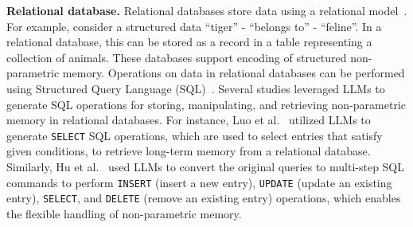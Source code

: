 \documentclass[journal,hideappendix]{vgtc}
\newenvironment{j_itemize}{
\begin{itemize}[]
  \setlength{\itemsep}{3pt}
  \setlength{\parskip}{0pt}
  \setlength{\parsep}{0pt}
}{\end{itemize}}
\begin{document}
\begin{j_itemize}

    \item[$\bullet$] \textbf{Relational database.} Relational databases store data using a relational model~\cite{codd1970relational,codd2007relational}. For example, consider a structured data ``tiger'' - ``belongs to'' - ``feline''. In a relational database, this can be stored as a record in a table representing a collection of animals. These databases support encoding of structured non-parametric memory. Operations on data in relational databases can be performed using Structured Query Language (SQL)~\cite{beaulieu2009learning}. Several studies leveraged LLMs to generate SQL operations for storing, manipulating, and retrieving non-parametric memory in relational databases. For instance, Luo et al.~\cite{luo2023chatkbqa} utilized LLMs to generate \texttt{SELECT} SQL operations, which are used to select entries that satisfy given conditions, to retrieve long-term memory from a relational database. Similarly, Hu et al.~\cite{hu2023chatdb} used LLMs to convert the original queries to multi-step SQL commands to perform \texttt{INSERT} (insert a new entry), \texttt{UPDATE} (update an existing entry), \texttt{SELECT}, and \texttt{DELETE} (remove an existing entry) operations, which enables the flexible handling of non-parametric memory.
    

\end{j_itemize}
\end{document}
